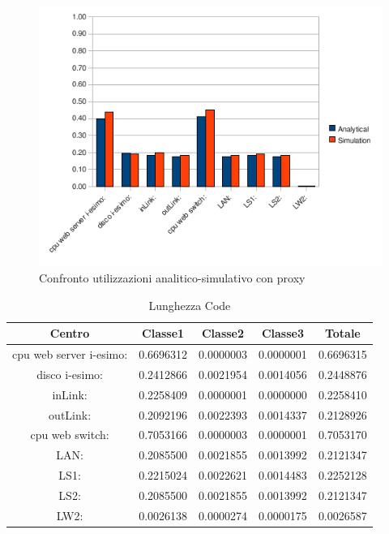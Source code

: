 \begin{figure}[H]
\begin{center}
\includegraphics[scale=0.8]{etc/utilizzazione_proxy.png}
\caption{Confronto utilizzazioni analitico-simulativo con proxy}
\label{Confronto proxy}
\end{center}
\end{figure}
\begin{table}[H]
\begin{center}
\begin{tabular}{||c|c|c|c|c||}
\hline
Centro &Classe1 &Classe2 &Classe3 &Totale\\
\hline
\hline
 cpu web server i-esimo: 	&0.6696312	&0.0000003	&0.0000001	&0.6696315	\\\hline
 disco i-esimo: 	&0.2412866	&0.0021954	&0.0014056	&0.2448876	\\\hline
 inLink: 	&0.2258409	&0.0000001	&0.0000000	&0.2258410	\\\hline
 outLink: 	&0.2092196	&0.0022393	&0.0014337	&0.2128926	\\\hline
 cpu web switch: 	&0.7053166	&0.0000003	&0.0000001	&0.7053170	\\\hline
 LAN: 	&0.2085500	&0.0021855	&0.0013992	&0.2121347	\\\hline
 LS1: 	&0.2215024	&0.0022621	&0.0014483	&0.2252128	\\\hline
 LS2: 	&0.2085500	&0.0021855	&0.0013992	&0.2121347	\\\hline
 LW2: 	&0.0026138	&0.0000274	&0.0000175	&0.0026587	\\\hline
\end{tabular}
\end{center}
\caption{Lunghezza Code}
\label{lunghezzacode}
\end{table}
